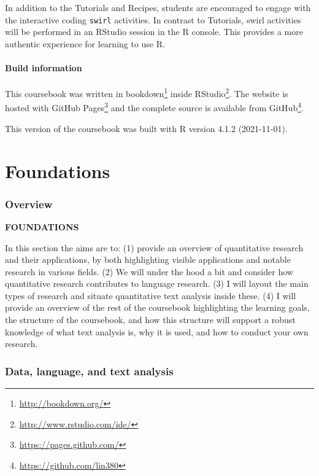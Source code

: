 \documentclass[
]{article}
\DeclareRobustCommand{\href}[2]{#2\footnote{\url{#1}}}
\begin{document}
In addition to the Tutorials and Recipes, students are encouraged to engage with the interactive coding \texttt{swirl} activities. In contrast to Tutorials, swirl activities will be performed in an RStudio session in the R console. This provides a more authentic experience for learning to use R.

\hypertarget{build-information}{%
\subsection*{Build information}\label{build-information}}

This coursebook was written in \href{http://bookdown.org/}{bookdown} inside \href{http://www.rstudio.com/ide/}{RStudio}. The website is hosted with \href{https://pages.github.com/}{GitHub Pages} and the complete source is available from \href{https://github.com/lin380}{GitHub}.

This version of the coursebook was built with R version 4.1.2 (2021-11-01).

\hypertarget{part-foundations}{%
\part{Foundations}\label{part-foundations}}

\hypertarget{foundations-overview}{%
\section*{Overview}\label{foundations-overview}}

\textbf{FOUNDATIONS}

In this section the aims are to: (1) provide an overview of quantitative research and their applications, by both highlighting visible applications and notable research in various fields. (2) We will under the hood a bit and consider how quantitative research contributes to language research. (3) I will layout the main types of research and situate quantitative text analysis inside these. (4) I will provide an overview of the rest of the coursebook highlighting the learning goals, the structure of the coursebook, and how this structure will support a robust knowledge of what text analysis is, why it is used, and how to conduct your own research.

\hypertarget{data-language-and-text-analysis}{%
\section{Data, language, and text analysis}\label{data-language-and-text-analysis}}
\end{document}
